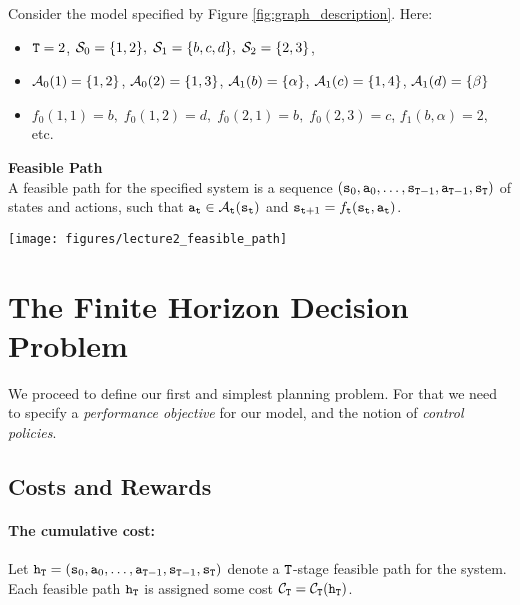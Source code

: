 \begin{example}
Consider the model specified by Figure \ref{fig:graph_description}. Here:
\begin{itemize}
  \item ${\tt T} = 2$, ${\mathcal{S}_0} = \{ 1,2\} ,\;{\mathcal{S}_1} = \{ b,c,d\} ,\;{\mathcal{S}_2} = \{ 2,3\} $,
  \item ${\mathcal{A}_0}(1) = \{ 1,2\} $, ${\mathcal{A}_0}(2) = \{ 1,3\} $, ${\mathcal{A}_1}(b) = \{ \alpha \} $, ${\mathcal{A}_1}(c) = \{ 1,4\} $, ${\mathcal{A}_1}(d) = \{ \beta \} $
  \item ${f_0}(1,1) = b,\;{f_0}(1,2) = d,\;{f_0}(2,1) = b,\;{f_0}(2,3) = c$, ${f_1}(b,\alpha ) = 2$, etc.
\end{itemize}
\end{example}

\begin{definition}{\textbf{Feasible Path}} \\
A feasible path for the specified system is a sequence
$({{\tt s}_0},{{\tt a}_0}, \ldots ,{{\tt s}_{{\tt T} -
1}},{{\tt a}_{{\tt T} - 1}},{{\tt s}_{\tt T}})$ of states and
actions, such that ${{\tt a}_{{\tt t}}} \in
{\mathcal{A}_{{\tt t}}}({{\tt s}_{{\tt t}}})$ and ${{\tt s}_{{\tt t} + 1}} =
{f_{{\tt t}}}({{\tt s}_{{\tt t}}},{{\tt a}_{{\tt t}}})$.

\bigskip

\begin{centering}
\texttt{[image: figures/lecture2\_feasible\_path]}\\
\end{centering}
\end{definition}

\section{The Finite Horizon Decision Problem}

We proceed to define our first and simplest planning problem. For
that we need to specify a \emph{performance objective} for our
model, and the notion of \emph{control policies}.

\subsection{Costs and Rewards}

\paragraph{The cumulative cost:}
Let ${{\tt h}_{\tt T}} = ({{\tt s}_0},{{\tt a}_0}, \ldots
,{{\tt a}_{{\tt T} - 1}},{{\tt s}_{{\tt T} -
1}},{{\tt s}_{\tt T}})$ denote a ${\tt T}$-stage feasible path
for the system. Each feasible path ${{\tt h}_{\tt T}}$ is assigned
some cost ${\mathcal{C}_{\tt T}} =
{\mathcal{C}_{\tt T}}({{\tt h}_{\tt T}})$.

